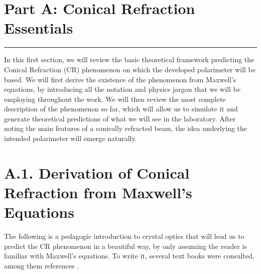 \documentclass[11pt, a4paper, twoside]{article} %
\begin{document}
\newpage

\newpage




\section*{\centering \huge{Part A: Conical Refraction Essentials}\vspace{-0.4cm}}
\noindent\rule{\textwidth}{0.4pt}
\vspace{-0.4cm}

In this first section, we will review the basic theoretical framework predicting the Conical Refraction (CR) phenomenon on which the developed polarimeter will be based. We will first derive the existence of the phenomenon from Maxwell's equations, by introducing all the notation and physics jargon that we will be employing throughout the work. We will then review the most complete description of the phenomenon so far, which will allow us to simulate it and generate theoretical predictions of what we will see in the laboratory. After noting the main features of a conically refracted beam, the idea underlying the intended polarimeter will emerge naturally.\vspace{-0.2cm}

\section*{A.1. Derivation of Conical Refraction from Maxwell's Equations\vspace{-0.2cm}}
The following is a pedagogic introduction to crystal optics that will lead us to predict the CR phenomenon in a beautiful way, by only assuming the reader is familiar with Maxwell's equations. To write it, several text books were consulted, among them references \cite{LL,magnetostatic,fundamentals}.\vspace{-0.3cm}
\end{document}
